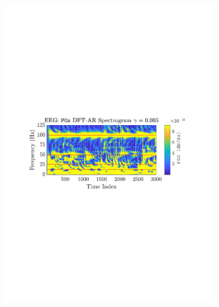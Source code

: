 \documentclass[12pt]{article}
\begin{document}
\begin{figure}[H]
				\begin{subfigure}{0.49\textwidth}
					\centering
					\includegraphics[trim={2.2cm 11.2cm 2.90cm  11.2cm}, clip, width=\textwidth]{../MATLAB/figures/q3_3d_fig03.pdf} 
					\captionsetup{justification=centering}
				\end{subfigure}
				\begin{subfigure}{0.49\textwidth}
					\centering

\end{subfigure}
\end{figure}
\end{document}
